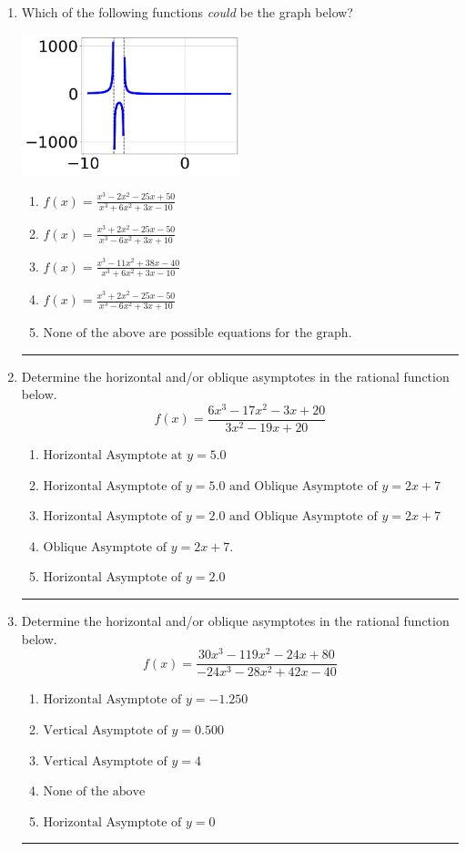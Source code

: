 \documentclass[14pt]{extbook}
\newcommand{\litem}[1]{\item#1\hspace*{-1cm}\rule{\textwidth}{0.4pt}}
\begin{document}
\begin{enumerate}
{\begin{enumerate}[label=\Alph*.]
\end{enumerate} }
\litem{
Which of the following functions \textit{could} be the graph below?
\begin{center}
    \includegraphics[width=0.5\textwidth]{../Figures/identifyGraphOfRationalFunctionCopyA.png}
\end{center}
\begin{enumerate}[label=\Alph*.]
\item \( f(x)=\frac{x^{3} -2 x^{2} -25 x + 50}{x^{3} +6 x^{2} +3 x -10} \)
\item \( f(x)=\frac{x^{3} +2 x^{2} -25 x -50}{x^{3} -6 x^{2} +3 x + 10} \)
\item \( f(x)=\frac{x^{3} -11 x^{2} +38 x -40}{x^{3} +6 x^{2} +3 x -10} \)
\item \( f(x)=\frac{x^{3} +2 x^{2} -25 x -50}{x^{3} -6 x^{2} +3 x + 10} \)
\item \( \text{None of the above are possible equations for the graph.} \)

\end{enumerate} }
\litem{
Determine the horizontal and/or oblique asymptotes in the rational function below.\[ f(x) = \frac{6x^{3} -17 x^{2} -3 x + 20}{3x^{2} -19 x + 20} \]\begin{enumerate}[label=\Alph*.]
\item \( \text{Horizontal Asymptote at } y = 5.0 \)
\item \( \text{Horizontal Asymptote of } y = 5.0 \text{ and Oblique Asymptote of } y = 2x + 7 \)
\item \( \text{Horizontal Asymptote of } y = 2.0 \text{ and Oblique Asymptote of } y = 2x + 7 \)
\item \( \text{Oblique Asymptote of } y = 2x + 7. \)
\item \( \text{Horizontal Asymptote of } y = 2.0  \)

\end{enumerate} }
\litem{
Determine the horizontal and/or oblique asymptotes in the rational function below.\[ f(x) = \frac{30x^{3} -119 x^{2} -24 x + 80}{-24x^{3} -28 x^{2} +42 x -40} \]\begin{enumerate}[label=\Alph*.]
\item \( \text{Horizontal Asymptote of } y = -1.250  \)
\item \( \text{Vertical Asymptote of } y = 0.500  \)
\item \( \text{Vertical Asymptote of } y = 4  \)
\item \( \text{None of the above} \)
\item \( \text{Horizontal Asymptote of } y = 0  \)


\end{enumerate}}
\end{enumerate}
\end{document}
